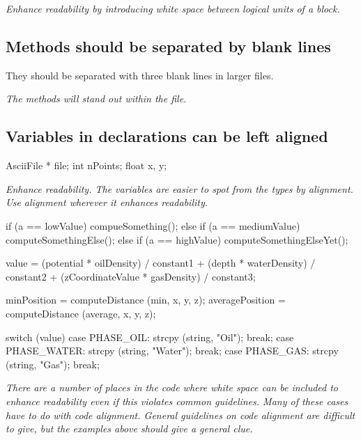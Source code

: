 \documentclass[a4paper,11pt,oneside]{scrbook}
\newcommand{\guideline}[1]{{\subsection{#1}}}
\newcommand{\motivation}[1]{{\normalfont \itshape #1}}
\begin{document}
\motivation{
  Enhance readability by introducing white space between logical units of a block.
}

\guideline{Methods should be separated by blank lines}

They should be separated with three blank lines in larger files.

\motivation{
  The methods will stand out within the file.
}

\guideline{Variables in declarations can be left aligned}

\begin{code}
  AsciiFile *  file;
  int          nPoints;
  float        x, y;
\end{code}

\motivation{
  Enhance readability. The variables are easier to spot from the types by alignment.
  Use alignment wherever it enhances readability. 
}

\begin{code}
  if      (a == lowValue)    compueSomething();
  else if (a == mediumValue) computeSomethingElse();
  else if (a == highValue)   computeSomethingElseYet();

  value = (potential        * oilDensity)   / constant1 +
          (depth            * waterDensity) / constant2 +
          (zCoordinateValue * gasDensity)   / constant3;

  minPosition     = computeDistance (min,     x, y, z);
  averagePosition = computeDistance (average, x, y, z);

  switch (value) {
    case PHASE_OIL:   strcpy (string, "Oil");   break;
    case PHASE_WATER: strcpy (string, "Water"); break;
    case PHASE_GAS:   strcpy (string, "Gas");   break;
  } 
\end{code}

\motivation{
  There are a number of places in the code where white space can be
  included to enhance readability even if this violates common
  guidelines. Many of these cases have to do with code
  alignment. General guidelines on code alignment are difficult to give,
  but the examples above should give a general clue.
}

\end{document}
